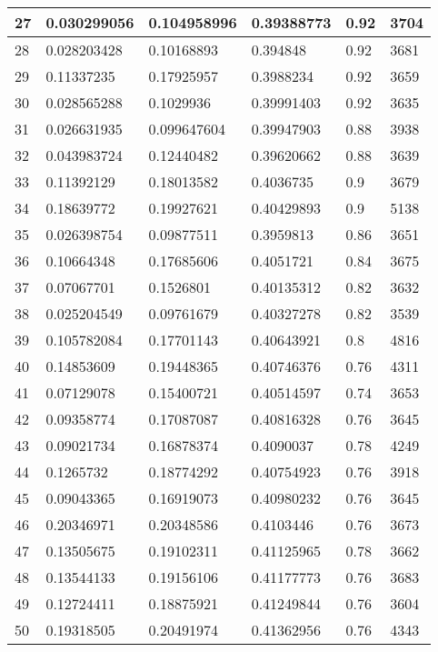\begin{longtable}{|l|l|l|l|l|l|}
27 & 0.030299056 & 0.104958996 & 0.39388773 & 0.92 & 3704 \\ \hline 
28 & 0.028203428 & 0.10168893 & 0.394848 & 0.92 & 3681 \\ \hline 
29 & 0.11337235 & 0.17925957 & 0.3988234 & 0.92 & 3659 \\ \hline 
30 & 0.028565288 & 0.1029936 & 0.39991403 & 0.92 & 3635 \\ \hline 
31 & 0.026631935 & 0.099647604 & 0.39947903 & 0.88 & 3938 \\ \hline 
32 & 0.043983724 & 0.12440482 & 0.39620662 & 0.88 & 3639 \\ \hline 
33 & 0.11392129 & 0.18013582 & 0.4036735 & 0.9 & 3679 \\ \hline 
34 & 0.18639772 & 0.19927621 & 0.40429893 & 0.9 & 5138 \\ \hline 
35 & 0.026398754 & 0.09877511 & 0.3959813 & 0.86 & 3651 \\ \hline 
36 & 0.10664348 & 0.17685606 & 0.4051721 & 0.84 & 3675 \\ \hline 
37 & 0.07067701 & 0.1526801 & 0.40135312 & 0.82 & 3632 \\ \hline 
38 & 0.025204549 & 0.09761679 & 0.40327278 & 0.82 & 3539 \\ \hline 
39 & 0.105782084 & 0.17701143 & 0.40643921 & 0.8 & 4816 \\ \hline 
40 & 0.14853609 & 0.19448365 & 0.40746376 & 0.76 & 4311 \\ \hline 
41 & 0.07129078 & 0.15400721 & 0.40514597 & 0.74 & 3653 \\ \hline 
42 & 0.09358774 & 0.17087087 & 0.40816328 & 0.76 & 3645 \\ \hline 
43 & 0.09021734 & 0.16878374 & 0.4090037 & 0.78 & 4249 \\ \hline 
44 & 0.1265732 & 0.18774292 & 0.40754923 & 0.76 & 3918 \\ \hline 
45 & 0.09043365 & 0.16919073 & 0.40980232 & 0.76 & 3645 \\ \hline 
46 & 0.20346971 & 0.20348586 & 0.4103446 & 0.76 & 3673 \\ \hline 
47 & 0.13505675 & 0.19102311 & 0.41125965 & 0.78 & 3662 \\ \hline 
48 & 0.13544133 & 0.19156106 & 0.41177773 & 0.76 & 3683 \\ \hline 
49 & 0.12724411 & 0.18875921 & 0.41249844 & 0.76 & 3604 \\ \hline 
50 & 0.19318505 & 0.20491974 & 0.41362956 & 0.76 & 4343 \\ \hline 
\end{longtable}
